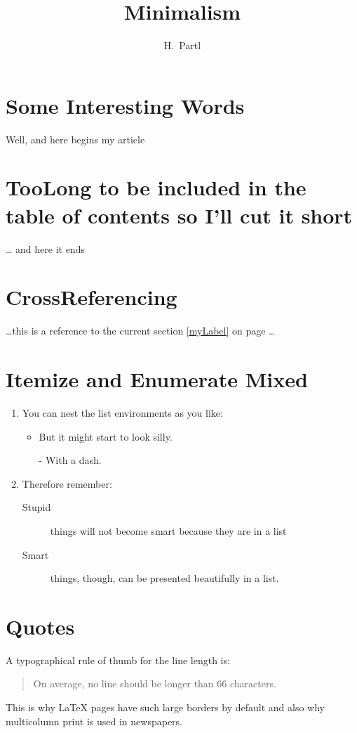 \documentclass[a4paper, 11pt]{article}
\author{H.~Partl}
\title{Minimalism}
\begin{document}
\maketitle
\tableofcontents

\section{Some Interesting Words}
Well, and here begins my article
\section[ShortTitle]{TooLong to be included in the table of contents %
so I'll cut it short}
\ldots{} and here it ends %
\section{CrossReferencing}
\ldots this is a reference to %
\label{myLabel} %
the current section \ref{myLabel} %
on page \pageref{myLabel} \ldots

\section{Itemize and Enumerate Mixed}
\flushleft %
\begin{enumerate}
\item You can nest the list environments as you like:

  \begin{itemize}
  \item But it might start to look silly.
  \item[-] With a dash.
  \end{itemize}

\item Therefore remember:

  \begin{description}
  \item[Stupid] things will not become smart because they%
    are in a list
  \item[Smart] things, though, can be presented%
    beautifully in a list.
  \end{description}
\end{enumerate}

\section{Quotes}
A typographical rule of thumb for the line length is:

\begin{quote}
  On average, no line should be longer than 66 characters.
\end{quote}

This is why \LaTeX{} pages have such large borders by default and %
also why multicolumn print is used in newspapers.
\end{document}

